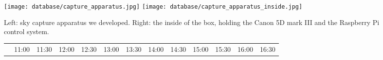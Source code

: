 \begin{figure}
\centering
\texttt{[image: database/capture\_apparatus.jpg]}
\texttt{[image: database/capture\_apparatus\_inside.jpg]}
\caption[Database capture apparatus]{Left: sky capture apparatus we developed. Right: the inside of the box, holding the Canon 5D mark III and the Raspberry Pi control system.}
\label{fig:capture-apparatus}
\end{figure}


\begin{figure}
    \centering
    \setlength{\tabcolsep}{0pt} 
    \newcommand{\customwidth}{.078\linewidth}
    \begin{tabular}{@{}rcccccccccccc@{}}
                                                     &
    \begin{minipage}{\customwidth}\centering\scriptsize 11:00 \end{minipage} &
    \begin{minipage}{\customwidth}\centering\scriptsize 11:30 \end{minipage} &
    \begin{minipage}{\customwidth}\centering\scriptsize 12:00 \end{minipage} &
    \begin{minipage}{\customwidth}\centering\scriptsize 12:30 \end{minipage} &
    \begin{minipage}{\customwidth}\centering\scriptsize 13:00 \end{minipage} &
    \begin{minipage}{\customwidth}\centering\scriptsize 13:30 \end{minipage} &
    \begin{minipage}{\customwidth}\centering\scriptsize 14:00 \end{minipage} &
    \begin{minipage}{\customwidth}\centering\scriptsize 14:30 \end{minipage} &
    \begin{minipage}{\customwidth}\centering\scriptsize 15:00 \end{minipage} &
    \begin{minipage}{\customwidth}\centering\scriptsize 15:30 \end{minipage} &
    \begin{minipage}{\customwidth}\centering\scriptsize 16:00 \end{minipage} &
    \begin{minipage}{\customwidth}\centering\scriptsize 16:30 \end{minipage}

\end{tabular}
\end{figure}
